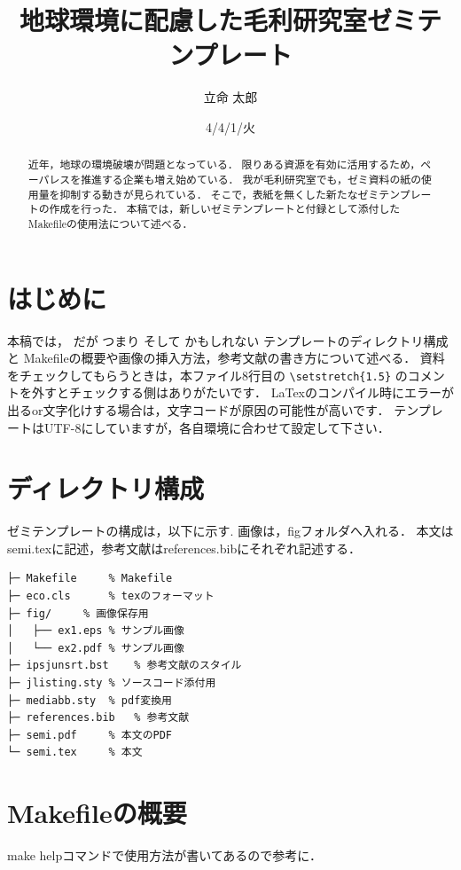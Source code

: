 \documentclass[submit,techreq,noauthor]{eco}	%
\begin{document}
\date   {4/4/1/火}				%
\title  {地球環境に配慮した毛利研究室ゼミテンプレート}	%
\author {立命 太郎}				%


\begin{abstract}
	近年，地球の環境破壊が問題となっている．
	限りある資源を有効に活用するため，ペーパレスを推進する企業も増え始めている．
	我が毛利研究室でも，ゼミ資料の紙の使用量を抑制する動きが見られている．
	そこで，表紙を無くした新たなゼミテンプレートの作成を行った．
	本稿では，新しいゼミテンプレートと付録として添付したMakefileの使用法について述べる．
\end{abstract}
\maketitle

\section{はじめに}
本稿では，
だが
つまり
そして
かもしれない
テンプレートのディレクトリ構成と
Makefileの概要や画像の挿入方法，参考文献の書き方について述べる．
資料をチェックしてもらうときは，本ファイル8行目の
\verb|\setstretch{1.5}|
のコメントを外すとチェックする側はありがたいです．
LaTexのコンパイル時にエラーが出るor文字化けする場合は，文字コードが原因の可能性が高いです．
テンプレートはUTF-8にしていますが，各自環境に合わせて設定して下さい．


\section{ディレクトリ構成}
ゼミテンプレートの構成は，以下に示す.
画像は，figフォルダへ入れる．
本文はsemi.texに記述，参考文献はreferences.bibにそれぞれ記述する．

\begin{lstlisting}
├─ Makefile		% Makefile
├─ eco.cls		% texのフォーマット
├─ fig/		% 画像保存用
│   ├── ex1.eps	% サンプル画像
│   └── ex2.pdf	% サンプル画像
├─ ipsjunsrt.bst	% 参考文献のスタイル
├─ jlisting.sty	% ソースコード添付用
├─ mediabb.sty 	% pdf変換用
├─ references.bib	% 参考文献
├─ semi.pdf		% 本文のPDF
└─ semi.tex		% 本文
\end{lstlisting}

\section{Makefileの概要}
make helpコマンドで使用方法が書いてあるので参考に．
\end{document}
